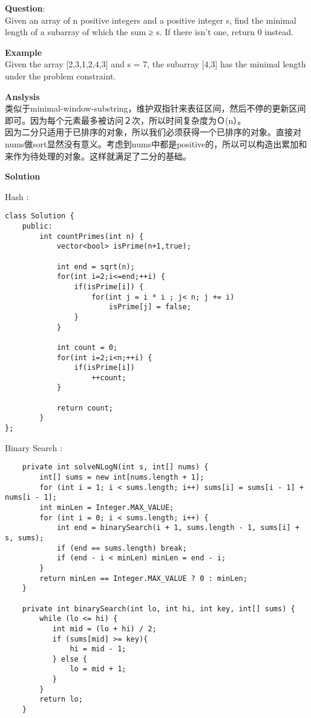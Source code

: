     
\begin{description}
    \item{\textbf{Question}}:\\%
		Given an array of n positive integers and a positive integer s, find the minimal length of a subarray of which the sum ≥ s. If there isn't one, return 0 instead.

    \item{\textbf{Example}}\\
		Given the array [2,3,1,2,4,3] and s = 7, the subarray [4,3] has the minimal length under the problem constraint.

    \item{\textbf{Anslysis}}\\
		类似于minimal-window-substring，维护双指针来表征区间，然后不停的更新区间即可。因为每个元素最多被访问２次，所以时间复杂度为Ｏ(n）。\\
		因为二分只适用于已排序的对象，所以我们必须获得一个已排序的对象。直接对nums做sort显然没有意义。考虑到nums中都是positive的，所以可以构造出累加和来作为待处理的对象。这样就满足了二分的基础。\\

    \item{\textbf{Solution}}\\
	\item{Hash} : \\
		\begin{lstlisting}
class Solution {
	public:
		int countPrimes(int n) {
			vector<bool> isPrime(n+1,true);

			int end = sqrt(n);
			for(int i=2;i<=end;++i) {
				if(isPrime[i]) {
					for(int j = i * i ; j< n; j += i) 
						isPrime[j] = false;
				}
			}

			int count = 0;
			for(int i=2;i<n;++i) {
				if(isPrime[i])
					++count;
			}

			return count;
		}
};
		\end{lstlisting}

	\item{Binary Search} : \\
		\begin{lstlisting}
    private int solveNLogN(int s, int[] nums) {
        int[] sums = new int[nums.length + 1];
        for (int i = 1; i < sums.length; i++) sums[i] = sums[i - 1] + nums[i - 1];
        int minLen = Integer.MAX_VALUE;
        for (int i = 0; i < sums.length; i++) {
            int end = binarySearch(i + 1, sums.length - 1, sums[i] + s, sums);
            if (end == sums.length) break;
            if (end - i < minLen) minLen = end - i;
        }
        return minLen == Integer.MAX_VALUE ? 0 : minLen;
    }

    private int binarySearch(int lo, int hi, int key, int[] sums) {
        while (lo <= hi) {
           int mid = (lo + hi) / 2;
           if (sums[mid] >= key){
               hi = mid - 1;
           } else {
               lo = mid + 1;
           }
        }
        return lo;
    }

		\end{lstlisting}
\end{description}

